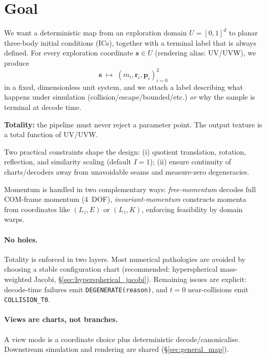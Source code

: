 \documentclass[11pt]{report}
\newcommand{\expldom}{U}
\newcommand{\explcoord}{\mathbf s}
\begin{document}
\section{Goal}
\label{sec:goal}

We want a deterministic map from an exploration domain $\expldom=[0,1]^d$ to planar three-body initial conditions (ICs), together with a terminal label that is always defined. For every exploration coordinate $\explcoord\in\expldom$ (rendering alias: UV/UVW), we produce
\[
\explcoord \;\longmapsto\; (m_i,\mathbf r_i,\mathbf p_i)_{i=0}^2
\]
in a fixed, dimensionless unit system, and we attach a label describing what happens under simulation (collision/escape/bounded/etc.) \emph{or} why the sample is terminal at decode time.

\textbf{Totality:} the pipeline must never reject a parameter point. The output texture is a total function of UV/UVW.

Two practical constraints shape the design:
(i) quotient translation, rotation, reflection, and similarity scaling (default $I=1$);
(ii) ensure continuity of charts/decoders away from unavoidable seams and measure-zero degeneracies.

Momentum is handled in two complementary ways:
\emph{free-momentum} decodes full COM-frame momentum (4~DOF),
\emph{invariant-momentum} constructs momenta from coordinates like $(L_z,E)$ or $(L_z,K)$, enforcing feasibility by domain warps.

\paragraph{No holes.}
Totality is enforced in two layers. Most numerical pathologies are avoided by choosing a stable configuration chart (recommended: hyperspherical mass-weighted Jacobi, \S\ref{sec:hyperspherical_jacobi}). Remaining issues are explicit: decode-time failures emit \texttt{DEGENERATE(reason)}, and $t=0$ near-collisions emit \texttt{COLLISION\_T0}.

\paragraph{Views are charts, not branches.}
A view mode is a coordinate choice plus deterministic decode/canonicalise. Downstream simulation and rendering are shared (\S\ref{sec:general_map}).

\end{document}
